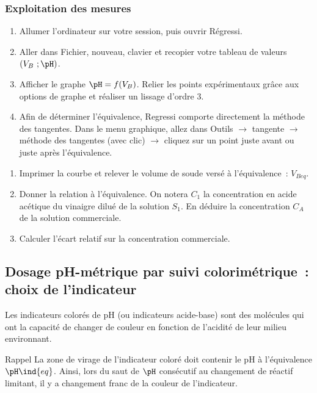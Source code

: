 \documentclass[a4paper, 10pt, final, garamond]{book}
\begin{document}
\subsubsection{Exploitation des mesures}

\begin{enumerate}
    \item Allumer l'ordinateur sur votre session, puis ouvrir Régressi.
    \item Aller dans Fichier, nouveau, clavier et recopier votre tableau de
        valeurs $(V_B~; \pH)$.
    \item Afficher le graphe $\pH = f(V_B)$. Relier les points expérimentaux
        grâce aux options de graphe et réaliser un lissage d'ordre 3.
    \item Afin de déterminer l'équivalence, Regressi comporte directement la
        méthode des tangentes. Dans le menu graphique, allez dans Outils
        $\rightarrow$ tangente $\rightarrow$ méthode des tangentes (avec clic)
        $\rightarrow$ cliquez sur un point juste avant ou juste après
        l'équivalence. 
\end{enumerate}
\begin{enumerate}[label=\sqenumi, start=7]
    \item Imprimer la courbe et relever le volume de soude versé à
        l'équivalence~: $V_{Beq}$.
    \item Donner la relation à l'équivalence. On notera $C_1$ la concentration
        en acide acétique du vinaigre dilué de la solution $S_1$. En déduire la
        concentration $C_A$ de la solution commerciale.
    \item Calculer l'écart relatif sur la concentration commerciale.
\end{enumerate}

\subsection{Dosage pH-métrique par suivi colorimétrique~: choix de l'indicateur}

Les indicateurs colorés de pH (ou indicateurs acide-base) sont des molécules qui ont la capacité de changer de couleur en fonction de l'acidité de leur milieu environnant.

\begin{timpo}{Rappel}
    La zone de virage de l'indicateur coloré doit contenir le pH à l'équivalence
    $\pH\ind{eq}$. Ainsi, lors du saut de $\pH$ consécutif au changement de
    réactif limitant, il y a changement franc de la couleur de l'indicateur. 
\end{timpo}
\end{document}
